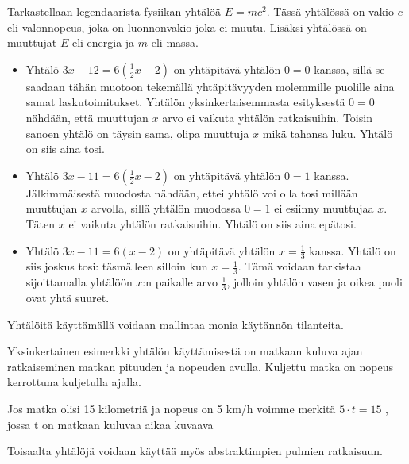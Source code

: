 \begin{esimerkki}
 Tarkastellaan legendaarista fysiikan yhtälöä $E=mc^2$. Tässä yhtälössä on vakio $c$ eli valonnopeus, joka on luonnonvakio joka ei muutu. Lisäksi yhtälössä on muuttujat $E$ eli energia ja $m$ eli massa.
\end{esimerkki}


\begin{esimerkki}
	\begin{itemize}
		\item{Yhtälö $3x-12=6(\frac{1}{2}x-2)$ on yhtäpitävä yhtälön $0=0$ kanssa, sillä se saadaan tähän muotoon 
		tekemällä yhtäpitävyyden molemmille puolille aina samat laskutoimitukset. Yhtälön yksinkertaisemmasta esityksestä $0=0$ nähdään, että muuttujan $x$ 
		arvo ei vaikuta yhtälön ratkaisuihin. Toisin sanoen yhtälö on täysin sama, olipa muuttuja $x$ mikä tahansa luku. Yhtälö on siis aina tosi.}
		\item{Yhtälö $3x-11=6(\frac{1}{2}x-2)$ on yhtäpitävä yhtälön $0=1$ kanssa. Jälkimmäisestä muodosta nähdään, ettei yhtälö voi olla tosi millään
		muuttujan $x$ arvolla, sillä yhtälön muodossa $0=1$ ei esiinny muuttujaa $x$. Täten $x$ ei vaikuta yhtälön ratkaisuihin. 
		Yhtälö on siis aina epätosi.}
		\item{Yhtälö $3x-11=6(x-2)$ on yhtäpitävä yhtälön $x=\frac{1}{3}$ kanssa. Yhtälö on siis joskus tosi: täsmälleen silloin kun $x=\frac{1}{3}$.
		Tämä voidaan tarkistaa sijoittamalla yhtälöön $x$:n paikalle arvo $\frac{1}{3}$, jolloin yhtälön vasen ja oikea puoli ovat yhtä suuret.}
	\end{itemize}

\end{esimerkki}






Yhtälöitä käyttämällä voidaan mallintaa monia käytännön tilanteita.

\begin{esimerkki}
	Yksinkertainen esimerkki yhtälön käyttämisestä on matkaan kuluva ajan ratkaiseminen matkan pituuden ja nopeuden avulla. Kuljettu matka on nopeus kerrottuna kuljetulla ajalla. 
	
	Jos matka olisi 15 kilometriä ja nopeus on 5 km/h voimme merkitä $5\cdot t=15$ , jossa t on matkaan kuluvaa aikaa kuvaava 
\end{esimerkki}

Toisaalta yhtälöjä voidaan käyttää myös abstraktimpien pulmien ratkaisuun.

